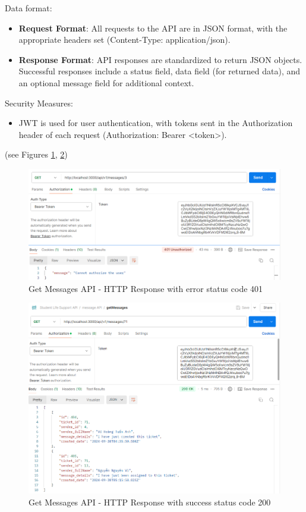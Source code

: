 	Data format:
	\begin{itemize}
		\item \textbf{Request Format}: All requests to the API are in JSON format, with the appropriate headers set (Content-Type: application/json).
		
		\item \textbf{Response Format}: API responses are standardized to return JSON objects. Successful responses include a status field, data field (for returned data), and an optional message field for additional context.
	\end{itemize}
	
	Security Measures: 
	\begin{itemize}
		\item JWT is used for user authentication, with tokens sent in the Authorization header of each request (Authorization: Bearer <token>).
	\end{itemize}
	
	(see Figures \ref{fig:getmessage-401}, \ref{fig:getmessage-200})
	
	
	\begin{figure}[H]
		\centering
		\includegraphics[width=0.8\linewidth]{graphics/api/getMessage-401}
		\caption{Get Messages API - HTTP Response with error status code 401}
		\label{fig:getmessage-401}
	\end{figure}
	
	\begin{figure}[H]
		\centering
		\includegraphics[width=0.8\linewidth]{graphics/api/getMessage-200}
		\caption{Get Messages API - HTTP Response with success status code 200}
		\label{fig:getmessage-200}
	\end{figure}
	
